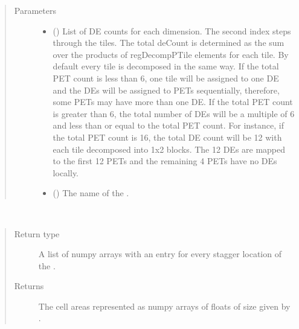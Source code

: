 \documentclass[letterpaper,10pt,english]{sphinxmanual}
\begin{document}
\begin{fulllineitems}
\begin{quote}\begin{description}
\item[{Parameters}] \leavevmode\begin{itemize}
\item {} 
 () \textendash{} List of DE counts for each dimension. The second index steps through
the tiles. The total deCount is determined as the sum over
the products of regDecompPTile elements for each tile.
By default every tile is decomposed in the same way.  If the total
PET count is less than 6, one tile will be assigned to one DE and the DEs
will be assigned to PETs sequentially, therefore, some PETs may have
more than one DE. If the total PET count is greater than 6, the total
number of DEs will be a multiple of 6 and less than or equal to the total
PET count. For instance, if the total PET count is 16, the total DE count
will be 12 with each tile decomposed into 1x2 blocks. The 12 DEs are mapped
to the first 12 PETs and the remaining 4 PETs have no DEs locally.

\item {} 
 () \textendash{} The name of the {\hyperref[\detokenize{grid:ESMF.api.grid.Grid}]{}}.

\end{itemize}

\end{description}\end{quote}

\begin{fulllineitems}
\label{\detokenize{grid:ESMF.api.grid.Grid.area}}~\begin{quote}\begin{description}
\item[{Return type}] \leavevmode
A list of numpy arrays with an entry for every stagger location
of the {\hyperref[\detokenize{grid:ESMF.api.grid.Grid}]{}}.

\item[{Returns}] \leavevmode
The {\hyperref[\detokenize{grid:ESMF.api.grid.Grid}]{}} cell areas represented as
numpy arrays of floats of size given by
.


\end{description}
\end{quote}
\end{fulllineitems}
\end{fulllineitems}
\end{document}
